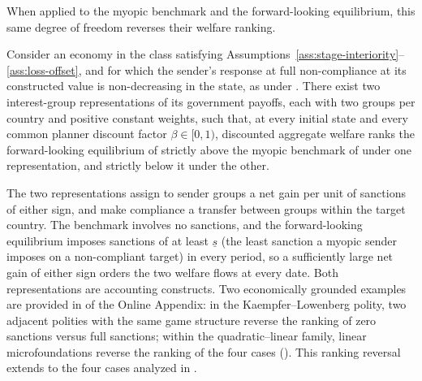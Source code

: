 When applied to the myopic benchmark and the forward-looking equilibrium, this same
degree of freedom reverses their welfare ranking.

\begin{proposition}
\label{prop:welfare-nonidentification}
Consider an economy in the class satisfying
Assumptions~\ref{ass:stage-interiority}--\ref{ass:loss-offset}, and for which the
sender's response at full non-compliance at its constructed value is non-decreasing in
the state, as under . There exist two interest-group
representations of its government payoffs, each with two groups per country and
positive constant weights, such that, at every initial state and every common planner
discount factor $\beta\in[0,1)$, discounted aggregate welfare ranks the forward-looking
equilibrium of  strictly above the myopic benchmark of
 under one representation, and strictly below it under the
other.
\end{proposition}

 The two representations assign to
sender groups a net gain per unit of sanctions of either sign, and make compliance a
transfer between groups within the target country. The benchmark involves no
sanctions, and the forward-looking equilibrium imposes sanctions of at least
$\underline s$ (the least sanction a myopic sender imposes on a non-compliant target) in every period, so a sufficiently large net gain of either sign orders
the two welfare flows at every date. Both representations are accounting constructs.
Two economically grounded examples are provided in  of the Online
Appendix: in the Kaempfer--Lowenberg polity, two adjacent polities with the same game
structure reverse the ranking of zero sanctions versus full sanctions; within the
quadratic--linear family, linear microfoundations reverse the ranking of the four cases
(). This ranking reversal extends to the
four cases analyzed in .

